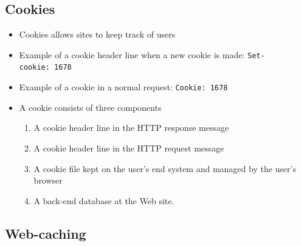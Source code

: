 \documentclass[11pt]{article}
\providecommand{\tightlist}{%
      \setlength{\itemsep}{0pt}\setlength{\parskip}{0pt}}
\begin{document}
    \subsection{Cookies}\label{cookies}

\begin{itemize}
\tightlist
\item
  Cookies allows sites to keep track of users
\item
  Example of a cookie header line when a new cookie is made:
  \texttt{Set-cookie:\ 1678}
\item
  Example of a cookie in a normal request: \texttt{Cookie:\ 1678}
\item
  A cookie consists of three components

  \begin{enumerate}
  \def\labelenumi{\arabic{enumi}.}
  \tightlist
  \item
    A cookie header line in the HTTP response message
  \item
    A cookie header line in the HTTP request message
  \item
    A cookie file kept on the user's end system and managed by the
    user's browser
  \item
    A back-end database at the Web site.
  \end{enumerate}
\end{itemize}

    \subsection{Web-caching}\label{web-caching}
\end{document}
